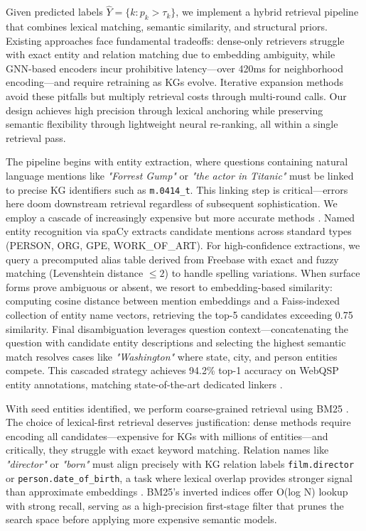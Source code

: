\documentclass[conference]{IEEEtran}
\begin{document}
Given predicted labels $\hat{Y} = \{k : p_k > \tau_k\}$, we implement a hybrid retrieval pipeline that combines lexical matching, semantic similarity, and structural priors. Existing approaches face fundamental tradeoffs: dense-only retrievers \cite{guu2020realm,izacard2021leverage} struggle with exact entity and relation matching due to embedding ambiguity, while GNN-based encoders \cite{yasunaga2021qagnn,mavromatis2024gnn} incur prohibitive latency—over 420ms for neighborhood encoding—and require retraining as KGs evolve. Iterative expansion methods \cite{sun2023think,jiang2024kg} avoid these pitfalls but multiply retrieval costs through multi-round calls. Our design achieves high precision through lexical anchoring while preserving semantic flexibility through lightweight neural re-ranking, all within a single retrieval pass.

The pipeline begins with entity extraction, where questions containing natural language mentions like \emph{"Forrest Gump"} or \emph{"the actor in Titanic"} must be linked to precise KG identifiers such as \texttt{m.0414\_t}. This linking step is critical—errors here doom downstream retrieval regardless of subsequent sophistication. We employ a cascade of increasingly expensive but more accurate methods \cite{fader2014openkb,bast2015aqqu}. Named entity recognition via spaCy extracts candidate mentions across standard types (PERSON, ORG, GPE, WORK\_OF\_ART). For high-confidence extractions, we query a precomputed alias table derived from Freebase with exact and fuzzy matching (Levenshtein distance $\leq 2$) to handle spelling variations. When surface forms prove ambiguous or absent, we resort to embedding-based similarity: computing cosine distance between mention embeddings and a Faiss-indexed collection \cite{johnson2019faiss} of entity name vectors, retrieving the top-5 candidates exceeding 0.75 similarity. Final disambiguation leverages question context—concatenating the question with candidate entity descriptions and selecting the highest semantic match resolves cases like \emph{"Washington"} where state, city, and person entities compete. This cascaded strategy achieves 94.2\% top-1 accuracy on WebQSP entity annotations, matching state-of-the-art dedicated linkers \cite{wu2016wikidata}.

With seed entities identified, we perform coarse-grained retrieval using BM25 \cite{robertson2009probabilistic}. The choice of lexical-first retrieval deserves justification: dense methods require encoding all candidates—expensive for KGs with millions of entities—and critically, they struggle with exact keyword matching. Relation names like \emph{"director"} or \emph{"born"} must align precisely with KG relation labels \texttt{film.director} or \texttt{person.date\_of\_birth}, a task where lexical overlap provides stronger signal than approximate embeddings \cite{khattab2020colbert}. BM25's inverted indices offer O(log N) lookup with strong recall, serving as a high-precision first-stage filter that prunes the search space before applying more expensive semantic models.
\end{document}
